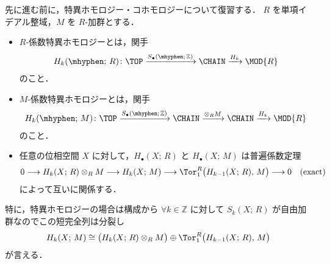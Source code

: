 \documentclass[TQFT_main]{subfiles}
\begin{document}
先に進む前に，特異ホモロジー・コホモロジーについて復習する．
$R$ を単項イデアル整域，$M$ を $R$-加群とする．
\begin{itemize}
    \item 
    $R$-係数特異ホモロジーとは，関手
    \begin{align}
        H_k (\mhyphen ;\, R)\colon \TOP \xrightarrow{S_{\bullet}(\mhyphen ;\, \mathbb{Z})} \CHAIN \xrightarrow{H_k} \MOD{R}
    \end{align}
    のこと．
    \item 
    $M$-係数特異ホモロジーとは，関手
    \begin{align}
        H_k (\mhyphen ;\, M)\colon \TOP \xrightarrow{S_{\bullet}(\mhyphen ;\, \mathbb{Z})} \CHAIN \xrightarrow{\otimes_R M} \CHAIN \xrightarrow{H_k} \MOD{R}
    \end{align}
    のこと．
    \item 
    任意の位相空間 $X$ に対して，$H_\bullet (X;\, R)$ と $H_\bullet (X;\, M)$ は普遍係数定理
    \begin{align}
        \label{eq:univ-coeff}
        0 \lto H_k(X;\, R) \otimes_R M \lto H_k(X;\, M) \lto \Tor_1^R \bigl( H_{k-1}(X;\, R),\, M \bigr) \lto 0 \quad (\text{exact})
    \end{align}
    によって互いに関係する．
\end{itemize}
特に，特異ホモロジーの場合は構成から $\forall k \in \mathbb{Z}$ に対して $S_k(X;\, R)$ が自由加群なのでこの短完全列は分裂し
\begin{align}
    H_k (X;\, M) \cong \bigl( H_k(X;\, R) \otimes_R M \bigr) \oplus \Tor_1^R \bigl( H_{k-1}(X;\, R),\, M \bigr)
\end{align}
が言える．
\end{document}
